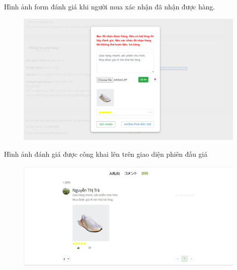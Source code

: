 \documentclass[../DoAn.tex]{subfiles}
\begin{document}
Hình ảnh form đánh giá khi người mua xác nhận đã nhận được hàng.
\begin{figure}[H]
    \centering
    \includegraphics[width=0.75\linewidth,height=6.5cm]{Hinhve/rate.png}
\end{figure}
Hình ảnh đánh giá được công khai lên trên giao diện phiên đấu giá
\begin{figure}[H]
    \centering
    \includegraphics[width=0.75\linewidth,height=5.36cm]{Hinhve/listrate.png}
\end{figure}
\newpage
\end{document}
